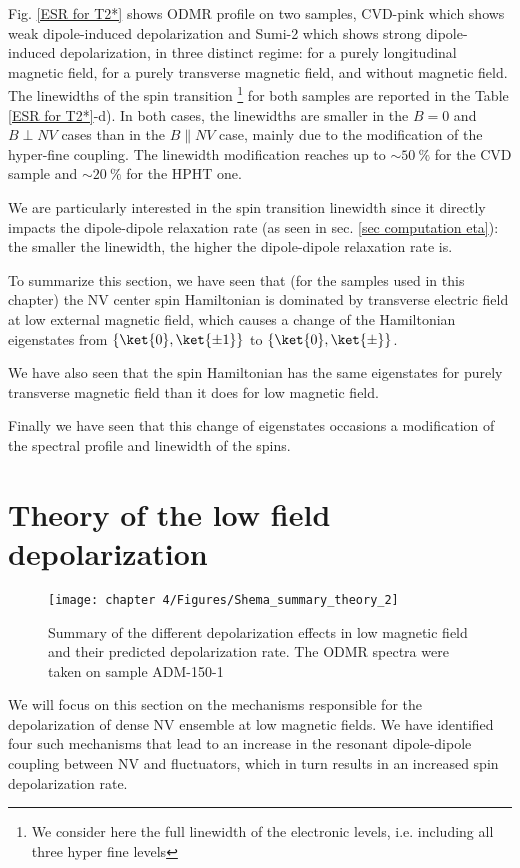\documentclass[a4paper, 11pt]{report}
\begin{document}
Fig. \ref{ESR for T2*} shows ODMR profile on two samples, CVD-pink which shows weak dipole-induced depolarization and Sumi-2 which shows strong dipole-induced depolarization, in three distinct regime: for a purely longitudinal magnetic field, for a purely transverse magnetic field, and without magnetic field. The linewidths of the spin transition \footnote{We consider here the full linewidth of the electronic levels, i.e. including all three hyper fine levels} for both samples are reported in the Table \ref{ESR for T2*}-d). In both cases, the linewidths are smaller in the $B=0$ and $B \perp NV$ cases than in the $B \parallel NV$ case, mainly due to the modification of the hyper-fine coupling. The linewidth modification reaches up to $\sim 50\ \%$ for the CVD sample and $\sim 20\ \%$ for the HPHT one.

We are particularly interested in the spin transition linewidth since it directly impacts the dipole-dipole relaxation rate (as seen in sec. \ref{sec computation eta}): the smaller the linewidth, the higher the dipole-dipole relaxation rate is.

\bigskip

To summarize this section, we have seen that (for the samples used in this chapter) the NV center spin Hamiltonian is dominated by transverse electric field at low external magnetic field, which causes a change of the Hamiltonian eigenstates from $\{ \ket{0}, \ket{\pm 1} \}$ to $\{ \ket{0}, \ket{\pm} \}$. 

We have also seen that the spin Hamiltonian has the same eigenstates for purely transverse magnetic field than it does for low magnetic field. 

Finally we have seen that this change of eigenstates occasions a modification of the spectral profile and linewidth of the spins.

\section{Theory of the low field depolarization}
\label{sec causes zero field}
\begin{figure}[h]
\centering
\texttt{[image: chapter 4/Figures/Shema\_summary\_theory\_2]}
\caption{Summary of the different depolarization effects in low magnetic field and their predicted depolarization rate. The ODMR spectra were taken on sample ADM-150-1}
\label{summary_theory}
\end{figure}

We will focus on this section on the mechanisms responsible for the depolarization of dense NV ensemble at low magnetic fields. We have identified four such mechanisms that lead to an increase in the resonant dipole-dipole coupling between NV and fluctuators, which in turn results in an increased spin depolarization rate.
\end{document}

